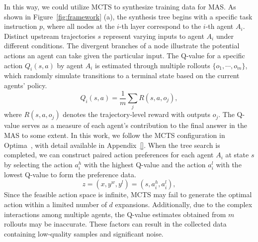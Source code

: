 In this way, we could utilize MCTS to synthesize training data for MAS. As shown in Figure~\ref{fig:framework} (a), the synthesis tree begins with a specific task instruction  $p$, where all nodes at the $i$-th layer correspond to the $i$-th agent $A_i$. Distinct upstream trajectories $s$ represent varying inputs to agent $A_i$ under different conditions. The divergent branches of a node illustrate the potential actions an agent can take given the particular input. The Q-value for a specific action $Q_i(s,a)$ by agent $A_i$ is estimated through multiple rollouts $\{o_1, \cdots, o_m \}$, which randomly simulate transitions to a terminal state based on the current agents' policy. 
\begin{equation}
    Q_i(s,a) = \frac{1}{m} \sum_j R(s,a,o_j),
\end{equation}
where $R(s,a,o_j)$ denotes the trajectory-level reward with outputs $o_j$. The Q-value serves as a measure of each agent's contribution to the final answer in the MAS to some extent.  In this work, we follow the MCTS configuration in Optima~\cite{DBLP:journals/corr/abs-2410-08115}, with detail available in Appendix~\ref{}. When the tree search is completed, we can construct paired action preferences for each agent $A_i$ at state $s$ by selecting the action $a_i^{h}$ with the highest Q-value and the action $a_i^{l}$ with the lowest Q-value to form the preference data.
\begin{equation}
    z = (x,y^w,y^l) = \left(s, a_i^{h}, a_i^{l}\right),
\end{equation}
Since the feasible action space is infinite, MCTS may fail to generate the optimal action within a limited number of $d$ expansions. Additionally, due to the complex interactions among multiple agents, the Q-value estimates obtained from $m$ rollouts may be inaccurate. These factors can result in the collected data containing low-quality samples and significant noise.


